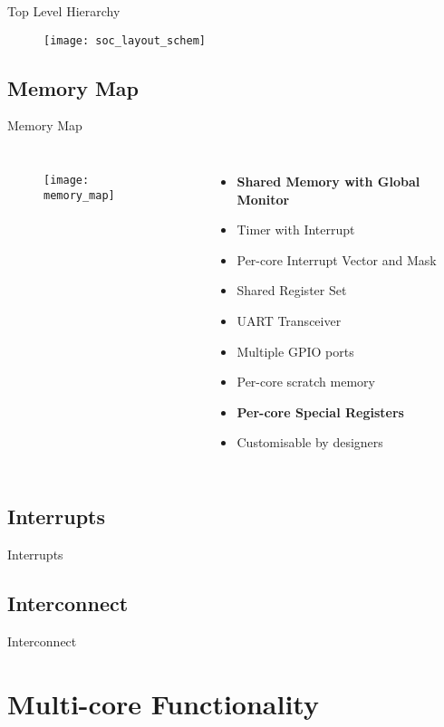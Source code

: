 \documentclass[aspectratio=169]{beamer}
\begin{document}
\begin{frame}{Top Level Hierarchy}
\begin{figure}
\texttt{[image: soc\_layout\_schem]}
\end{figure}
\end{frame}

\subsection{Memory Map}
\begin{frame}{Memory Map}
\begin{columns}
\begin{figure}
\texttt{[image: memory\_map]}
\end{figure}
\begin{itemize}
    \item \textbf{Shared Memory with Global Monitor}
    \item Timer with Interrupt
    \item Per-core Interrupt Vector and Mask
    \item Shared Register Set
    \item UART Transceiver
    \item Multiple GPIO ports
    \item Per-core scratch memory
    \item \textbf{Per-core Special Registers}
    \item Customisable by designers
\end{itemize}
\end{columns}
\end{frame}

\subsection{Interrupts}
\begin{frame}{Interrupts}
\end{frame}

\subsection{Interconnect}
\begin{frame}{Interconnect}
\end{frame}

\section{Multi-core Functionality}
\frame{\tableofcontents[currentsection, subsectionstyle=show/show/hide]}
\end{document}
